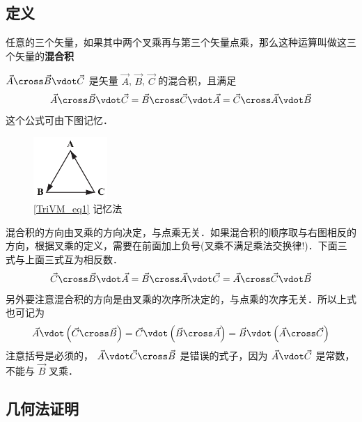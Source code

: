 
\subsection{定义}

任意的三个矢量，如果其中两个叉乘再与第三个矢量点乘，那么这种运算叫做这三个矢量的\textbf{混合积}

$\vec A \cross \vec B \vdot \vec C$ 是矢量 $\vec A$, $\vec B$, $\vec C$ 的混合积，且满足
\begin{equation}\label{TriVM_eq1}
\vec A \cross \vec B \vdot \vec C = \vec B \cross \vec C \vdot \vec A = \vec C \cross \vec A \vdot \vec B 
\end{equation} 
这个公式可由下图记忆．
\begin{figure}[h]
\centering
\includegraphics[width=0.25\textwidth]{./figures/TriVM.pdf}
\caption{\autoref{TriVM_eq1} 记忆法}
\end{figure}
混合积的方向由叉乘的方向决定，与点乘无关．如果混合积的顺序取与右图相反的方向，根据叉乘的定义，需要在前面加上负号(叉乘不满足乘法交换律!)．下面三式与上面三式互为相反数．
\begin{equation}
\vec C \cross \vec B \vdot \vec A = \vec B \cross \vec A \vdot \vec C = \vec A \cross \vec C \vdot \vec B
\end{equation} 
另外要注意混合积的方向是由叉乘的次序所决定的，与点乘的次序无关．所以上式也可记为
 \begin{equation}
\vec A \vdot \left( {\vec C \cross \vec B} \right) = \vec C \vdot \left( {\vec B \cross \vec A} \right) = \vec B \vdot \left( {\vec A \cross \vec C} \right)
\end{equation} 
注意括号是必须的， $\vec A \vdot \vec C \cross \vec B$ 是错误的式子，因为 $\vec A \vdot \vec C$ 是常数，不能与 $\vec B$ 叉乘．


\subsection{几何法证明}

